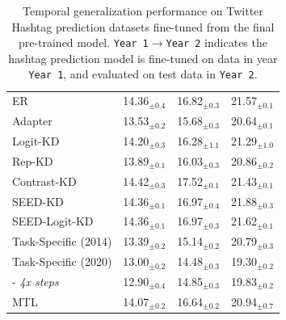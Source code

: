\begin{table}[]
{\begin{tabular}{@{}lccc@{}}
ER            & 14.36$_{\pm 0.4}$     & 16.82$_{\pm 0.3}$     & 21.57$_{\pm 0.1}$     \\
Adapter       &     13.53$_{\pm 0.2}$       &   15.68$_{\pm 0.3}$        &      20.64$_{\pm 0.1}$         \\
Logit-KD      & 14.20$_{\pm 0.3}$     & 16.28$_{\pm 1.1}$     & 21.29$_{\pm 1.0}$     \\
Rep-KD        &    13.89$_{\pm 0.1}$       &        16.03$_{\pm 0.3}$       &           20.86$_{\pm 0.2}$    \\
Contrast-KD   &     14.42$_{\pm 0.3}$       &       17.52$_{\pm 0.1}$        &      21.43$_{\pm 0.1}$         \\
SEED-KD & 14.36$_{\pm 0.1}$ & 16.97$_{\pm 0.4}$ & 21.88$_{\pm 0.3}$ \\
SEED-Logit-KD & 14.36$_{\pm 0.1}$    &     16.97$_{\pm 0.3}$      &         21.62$_{\pm 0.1}$      \\
Task-Specific (2014) &    13.39$_{\pm 0.2}$        &        15.14$_{\pm 0.2}$                   &       20.79$_{\pm 0.3}$              \\
Task-Specific (2020) & 13.00$_{\pm 0.2}$     & 14.48$_{\pm 0.3}$     & 19.30$_{\pm 0.2}$     \\
- \textit{4x steps}& 12.90$_{\pm 0.4}$     & 14.85$_{\pm 0.3}$     & 19.83$_{\pm 0.2}$     \\
MTL           &     14.07$_{\pm 0.2}$       &       16.64$_{\pm0.2}$    &       20.94$_{\pm 0.7}$   \\ 
\bottomrule
\end{tabular}
}
\caption{\small Temporal generalization performance on Twitter Hashtag prediction datasets fine-tuned from the final pre-trained model. \texttt{Year 1}$\to$\texttt{Year 2} indicates the hashtag prediction model is fine-tuned on data in year \texttt{Year 1}, and evaluated on test data in \texttt{Year 2}.}
\vspace{-0.3cm}
\label{tab:twitter_tg_full}
\end{table}